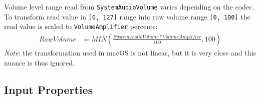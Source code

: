 \documentclass[]{article}
\begin{document}
\begin{enumerate}
  Volume level range read from \texttt{SystemAudioVolume} varies depending on the codec.
  To transform read value in \texttt{[0, 127]} range into raw volume range \texttt{[0, 100]}
  the read value is scaled to \texttt{VolumeAmplifier} percents:
  \begin{align*}
      RawVolume &= MIN(\frac{SystemAudioVolume * VolumeAmplifier}{100}, 100)
  \end{align*}
  \emph{Note}: the transformation used in macOS is not linear, but it is very close
  and this nuance is thus ignored.

\end{enumerate}

\subsection{Input Properties}\label{uefiinputprops}
\end{document}
